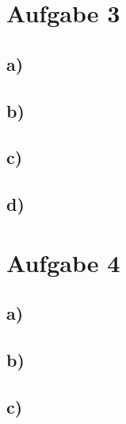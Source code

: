 \documentclass[a4paper, 11pt]{article}
\begin{document}
\section{Aufgabe 3}
\label{sec:orgc855dac}
\subsection{a)}
\label{sec:org966af4f}
\subsection{b)}
\label{sec:org571a5d9}
\subsection{c)}
\label{sec:orgb3ff4f5}
\subsection{d)}
\label{sec:org203563a}
\section{Aufgabe 4}
\label{sec:org6060963}
\subsection{a)}
\label{sec:orgbba321e}
\subsection{b)}
\label{sec:orgad293ef}
\subsection{c)}
\label{sec:orgba9b438}
\end{document}
